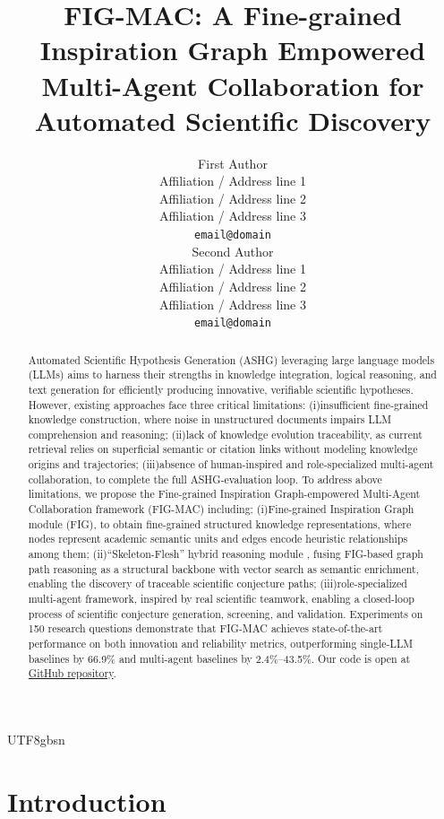 \documentclass[11pt]{article}
\title{FIG-MAC: A Fine-grained Inspiration Graph Empowered\\Multi-Agent Collaboration for Automated Scientific Discovery}
\author{First Author \\
  Affiliation / Address line 1 \\
  Affiliation / Address line 2 \\
  Affiliation / Address line 3 \\
  \texttt{email@domain} \\\And
  Second Author \\
  Affiliation / Address line 1 \\
  Affiliation / Address line 2 \\
  Affiliation / Address line 3 \\
  \texttt{email@domain} \\}
\begin{document}
\begin{CJK}{UTF8}{gbsn}

\maketitle
\begin{abstract}
Automated Scientific Hypothesis Generation (ASHG) leveraging large language models (LLMs) aims to harness their strengths in knowledge integration, logical reasoning, and text generation for efficiently producing innovative, verifiable scientific hypotheses. However, existing approaches face three critical limitations: (i)insufficient fine-grained knowledge construction, where noise in unstructured documents impairs LLM comprehension and reasoning; (ii)lack of knowledge evolution traceability, as current retrieval relies on superficial semantic or citation links without modeling knowledge origins and trajectories; (iii)absence of human-inspired and role-specialized multi-agent collaboration, to complete the full ASHG-evaluation loop. To address above limitations, we propose the Fine-grained Inspiration Graph-empowered Multi-Agent Collaboration framework (FIG-MAC) including: (i)Fine-grained Inspiration Graph module (FIG), to obtain fine-grained structured knowledge representations, where nodes represent academic semantic units and edges encode heuristic relationships among them; (ii)“Skeleton-Flesh” hybrid reasoning module , fusing FIG-based graph path reasoning as a structural backbone with vector search as semantic enrichment, enabling the discovery of traceable scientific conjecture paths; (iii)role-specialized multi-agent framework, inspired by real scientific teamwork, enabling a closed-loop process of scientific conjecture generation, screening, and validation. Experiments on 150 research questions demonstrate that FIG-MAC achieves state-of-the-art performance on both innovation and reliability metrics, outperforming single-LLM baselines by 66.9\% and multi-agent baselines by 2.4\%–43.5\%. Our code is open at  \href{https://github.com/SiyuanChenToDo/KG-LLM.git}{GitHub repository}.
\end{abstract}

\section{Introduction}


\end{CJK}
\end{document}
